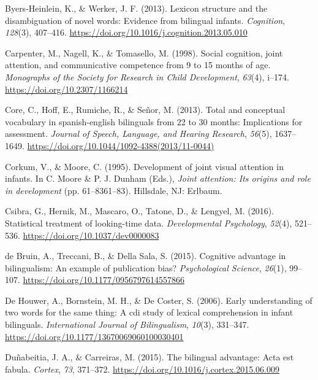 \documentclass[
  english,
  ,man,floatsintext]{apa6}
\begin{document}
\leavevmode\hypertarget{ref-Byers-Heinlein_Werker_2013}{}%
Byers-Heinlein, K., \& Werker, J. F. (2013). Lexicon structure and the disambiguation of novel words: Evidence from bilingual infants. \emph{Cognition}, \emph{128}(3), 407--416. \url{https://doi.org/10.1016/j.cognition.2013.05.010}

\leavevmode\hypertarget{ref-Carpenter_etal_1998}{}%
Carpenter, M., Nagell, K., \& Tomasello, M. (1998). Social cognition, joint attention, and communicative competence from 9 to 15 months of age. \emph{Monographs of the Society for Research in Child Development}, \emph{63}(4), i--174. \url{https://doi.org/10.2307/1166214}

\leavevmode\hypertarget{ref-Core_etal_2013}{}%
Core, C., Hoff, E., Rumiche, R., \& Señor, M. (2013). Total and conceptual vocabulary in spanish-english bilinguals from 22 to 30 months: Implications for assessment. \emph{Journal of Speech, Language, and Hearing Research}, \emph{56}(5), 1637--1649. \url{https://doi.org/10.1044/1092-4388(2013/11-0044)}

\leavevmode\hypertarget{ref-Corkum_Moore_1995}{}%
Corkum, V., \& Moore, C. (1995). Development of joint visual attention in infants. In C. Moore \& P. J. Dunham (Eds.), \emph{Joint attention: Its origins and role in development} (pp. 61--8361--83). Hillsdale, NJ: Erlbaum.

\leavevmode\hypertarget{ref-Csibra_etal_2016}{}%
Csibra, G., Hernik, M., Mascaro, O., Tatone, D., \& Lengyel, M. (2016). Statistical treatment of looking-time data. \emph{Developmental Psychology}, \emph{52}(4), 521--536. \url{https://doi.org/10.1037/dev0000083}

\leavevmode\hypertarget{ref-deBruin_etal_2015}{}%
de Bruin, A., Treccani, B., \& Della Sala, S. (2015). Cognitive advantage in bilingualism: An example of publication bias? \emph{Psychological Science}, \emph{26}(1), 99--107. \url{https://doi.org/10.1177/0956797614557866}

\leavevmode\hypertarget{ref-DeHouwer_etal_2006}{}%
De Houwer, A., Bornstein, M. H., \& De Coster, S. (2006). Early understanding of two words for the same thing: A cdi study of lexical comprehension in infant bilinguals. \emph{International Journal of Bilingualism}, \emph{10}(3), 331--347. \url{https://doi.org/10.1177/13670069060100030401}

\leavevmode\hypertarget{ref-Dunabeitia_Carreiras_2015}{}%
Duñabeitia, J. A., \& Carreiras, M. (2015). The bilingual advantage: Acta est fabula. \emph{Cortex}, \emph{73}, 371--372. \url{https://doi.org/10.1016/j.cortex.2015.06.009}
\end{document}
